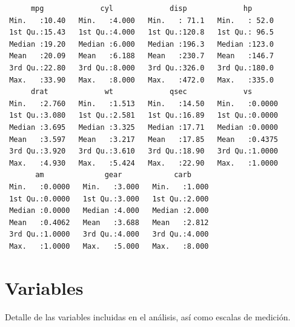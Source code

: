 \documentclass[
  spanish,
  a4paper,
  oneside]{scrbook}
\begin{document}
\begin{verbatim}
      mpg             cyl             disp             hp       
 Min.   :10.40   Min.   :4.000   Min.   : 71.1   Min.   : 52.0  
 1st Qu.:15.43   1st Qu.:4.000   1st Qu.:120.8   1st Qu.: 96.5  
 Median :19.20   Median :6.000   Median :196.3   Median :123.0  
 Mean   :20.09   Mean   :6.188   Mean   :230.7   Mean   :146.7  
 3rd Qu.:22.80   3rd Qu.:8.000   3rd Qu.:326.0   3rd Qu.:180.0  
 Max.   :33.90   Max.   :8.000   Max.   :472.0   Max.   :335.0  
      drat             wt             qsec             vs        
 Min.   :2.760   Min.   :1.513   Min.   :14.50   Min.   :0.0000  
 1st Qu.:3.080   1st Qu.:2.581   1st Qu.:16.89   1st Qu.:0.0000  
 Median :3.695   Median :3.325   Median :17.71   Median :0.0000  
 Mean   :3.597   Mean   :3.217   Mean   :17.85   Mean   :0.4375  
 3rd Qu.:3.920   3rd Qu.:3.610   3rd Qu.:18.90   3rd Qu.:1.0000  
 Max.   :4.930   Max.   :5.424   Max.   :22.90   Max.   :1.0000  
       am              gear            carb      
 Min.   :0.0000   Min.   :3.000   Min.   :1.000  
 1st Qu.:0.0000   1st Qu.:3.000   1st Qu.:2.000  
 Median :0.0000   Median :4.000   Median :2.000  
 Mean   :0.4062   Mean   :3.688   Mean   :2.812  
 3rd Qu.:1.0000   3rd Qu.:4.000   3rd Qu.:4.000  
 Max.   :1.0000   Max.   :5.000   Max.   :8.000  
\end{verbatim}

\section{Variables}\label{variables}

Detalle de las variables incluidas en el análisis, así como escalas de
medición.
\end{document}

